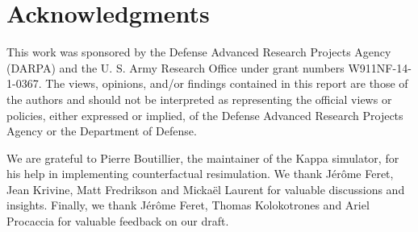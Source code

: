 \section*{Acknowledgments}

This work was sponsored by the Defense Advanced Research Projects
Agency (DARPA) and the U. S. Army Research Office under grant numbers
W911NF-14-1-0367.  The views, opinions, and/or findings
contained in this report are those of the authors and should not be
interpreted as representing the official views or policies, either
expressed or implied, of the Defense Advanced Research Projects Agency
or the Department of Defense. 

We are grateful to Pierre Boutillier, the maintainer of the Kappa
simulator, for his help in implementing counterfactual resimulation.
We thank J\'{e}r\^{o}me Feret, Jean Krivine, Matt Fredrikson and
Micka\"{e}l Laurent for valuable discussions and insights.  Finally,
we thank J\'{e}r\^{o}me Feret, Thomas Kolokotrones and Ariel Procaccia
for valuable feedback on our draft.
